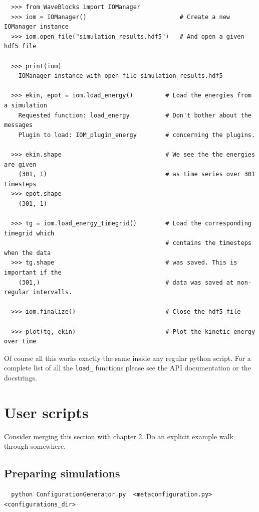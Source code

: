 \documentclass[a4paper,10pt]{report}
\begin{document}
\begin{verbatim}
  >>> from WaveBlocks import IOManager
  >>> iom = IOManager()                          # Create a new IOManager instance
  >>> iom.open_file("simulation_results.hdf5")   # And open a given hdf5 file

  >>> print(iom)
    IOManager instance with open file simulation_results.hdf5

  >>> ekin, epot = iom.load_energy()         # Load the energies from a simulation
    Requested function: load_energy          # Don't bother about the messages
    Plugin to load: IOM_plugin_energy        # concerning the plugins.

  >>> ekin.shape                             # We see the the energies are given
    (301, 1)                                 # as time series over 301 timesteps
  >>> epot.shape
    (301, 1)

  >>> tg = iom.load_energy_timegrid()        # Load the corresponding timegrid which
                                             # contains the timesteps when the data
  >>> tg.shape                               # was saved. This is important if the
    (301,)                                   # data was saved at non-regular intervalls.

  >>> iom.finalize()                         # Close the hdf5 file

  >>> plot(tg, ekin)                         # Plot the kinetic energy over time
\end{verbatim}

Of course all this works exactly the same inside any regular python script.
For a complete list of all the \verb|load_| functions please see the API
documentation or the docstrings.

\section{User scripts}

Consider merging this section with chapter 2.
Do an explicit example walk through somewhere.

\subsection{Preparing simulations}

\begin{verbatim}
  python ConfigurationGenerator.py  <metaconfiguration.py> <configurations_dir>
\end{verbatim}
\end{document}
